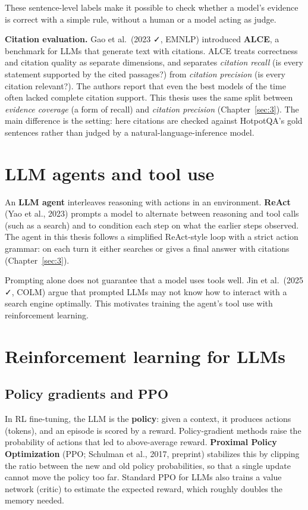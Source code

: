 These sentence-level labels make it possible to check whether a model's
evidence is correct with a simple rule, without a human or a model
acting as judge.

\textbf{Citation evaluation.} Gao et al.~(2023 ✓, EMNLP) introduced
\textbf{ALCE}, a benchmark for LLMs that generate text with citations.
ALCE treats correctness and citation quality as separate dimensions, and
separates \emph{citation recall} (is every statement supported by the
cited passages?) from \emph{citation precision} (is every citation
relevant?). The authors report that even the best models of the time
often lacked complete citation support. This thesis uses the same split
between \emph{evidence coverage} (a form of recall) and \emph{citation
precision} (Chapter~\ref{sec:3}). The main difference is the setting:
here citations are checked against HotpotQA's gold sentences rather than
judged by a natural-language-inference model.

\section{LLM agents and tool use}\label{sec:2.4}

An \textbf{LLM agent} interleaves reasoning with actions in an
environment. \textbf{ReAct} (Yao et al., 2023) prompts a model to
alternate between reasoning and tool calls (such as a search) and to
condition each step on what the earlier steps observed. The agent in
this thesis follows a simplified ReAct-style loop with a strict action
grammar: on each turn it either searches or gives a final answer with
citations (Chapter~\ref{sec:3}).

Prompting alone does not guarantee that a model uses tools well. Jin et
al.~(2025 ✓, COLM) argue that prompted LLMs may not know how to interact
with a search engine optimally. This motivates training the agent's tool
use with reinforcement learning.

\section{Reinforcement learning for LLMs}\label{sec:2.5}

\subsection{Policy gradients and PPO}\label{sec:2.5.1}

In RL fine-tuning, the LLM is the \textbf{policy}: given a context, it
produces actions (tokens), and an episode is scored by a reward.
Policy-gradient methods raise the probability of actions that led to
above-average reward. \textbf{Proximal Policy Optimization} (PPO;
Schulman et al., 2017, preprint) stabilizes this by clipping the ratio
between the new and old policy probabilities, so that a single update
cannot move the policy too far. Standard PPO for LLMs also trains a
value network (critic) to estimate the expected reward, which roughly
doubles the memory needed.

